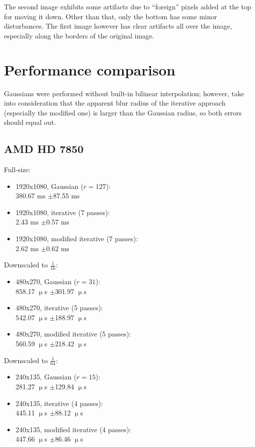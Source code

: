 \documentclass[english,fleqn,10pt,twocolumn]{article}
\begin{document}
The second image exhibits some artifacts due to “foreign” pixels added at the top for moving it down. Other than that, only the bottom has some minor disturbances. The first image however has
clear artifacts all over the image, especially along the borders of the original image.


\section{Performance comparison}

Gaussians were performed without built-in bilinear interpolation; however, take into consideration that the apparent blur radius of the iterative approach (especially the modified one) is larger
than the Gaussian radius, so both errors should equal out.

\subsection{AMD HD 7850}

Full-size:
\begin{itemize}
    \item 1920x1080, Gaussian ($r = 127$): \\
        380.67 ms $\pm$87.55 ms
    \item 1920x1080, iterative (7 passes): \\
        2.43 ms $\pm$0.57 ms
    \item 1920x1080, modified iterative (7 passes): \\
        2.62 ms $\pm$0.62 ms
\end{itemize}

Downscaled to $\frac 1{16}$:
\begin{itemize}
    \item 480x270, Gaussian ($r = 31$): \\
        858.17 $\upmu$s $\pm$301.97 $\upmu$s
    \item 480x270, iterative (5 passes): \\
        542.07 $\upmu$s $\pm$188.97 $\upmu$s 
    \item 480x270, modified iterative (5 passes): \\
        560.59 $\upmu$s $\pm$218.42 $\upmu$s
\end{itemize}

Downscaled to $\frac 1{64}$:
\begin{itemize}
    \item 240x135, Gaussian ($r = 15$): \\
        281.27 $\upmu$s $\pm$129.84 $\upmu$s
    \item 240x135, iterative (4 passes): \\
        445.11 $\upmu$s $\pm$88.12 $\upmu$s
    \item 240x135, modified iterative (4 passes): \\
        447.66 $\upmu$s $\pm$86.46 $\upmu$s
\end{itemize}
\end{document}
